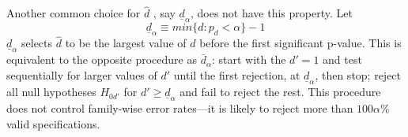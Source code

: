 \documentclass[12pt]{article}\usepackage[]{graphicx}\usepackage[]{color}
\newcommand{\dalphaU}{\bar{d}_\alpha}
\newcommand{\dalphaB}{\underline{d}_\alpha}
\begin{document}
Another common choice for $\hat{d}$  \citep[e.g.][]{lutkepohl2005new}, say $\dalphaB$,
does not have this property.
Let
\begin{equation}
\dalphaB\equiv min\{d: p_d<\alpha\}-1
\end{equation}
$\dalphaB$ selects $\hat{d}$ to be the largest value of $d$ before the first
significant p-value.
This is equivalent to the opposite procedure as $\dalphaU$: start with the $d'=1$
and test sequentially for larger values of $d'$ until the first
rejection, at $\dalphaB$, then stop; reject all null
hypotheses $H_{0d'}$ for $d'\ge \dalphaB$ and fail to
reject the rest.
This procedure does not control family-wise error rates---it is likely
to reject more than $100\alpha$\% valid specifications.

\end{document}
